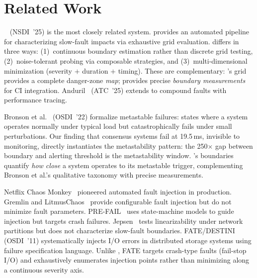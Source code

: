 \section{Related Work}
\label{sec:related}

\xinda{}~\cite{xinda} (NSDI~'25) is the most closely related system.
\xinda{} provides an automated pipeline for characterizing slow-fault
impacts via exhaustive grid evaluation. \system{} differs in three ways:
(1)~continuous boundary estimation rather than discrete grid testing,
(2)~noise-tolerant probing via composable strategies, and (3)~multi-dimensional
minimization (severity $+$ duration $+$ timing). These are complementary:
\xinda{}'s grid provides a complete danger-zone \emph{map}; \system{}
provides precise \emph{boundary measurements} for CI integration.
Anduril~\cite{anduril} (ATC~'25) extends \xinda{} to compound faults
with performance tracing.

Bronson et al.~\cite{bronson-metastable} (OSDI~'22) formalize metastable
failures: states where a system operates normally under typical load but
catastrophically fails under small perturbations. Our finding that consensus
systems fail at 19.5\,ms, invisible to monitoring, directly instantiates
the metastability pattern: the 250$\times$ gap between boundary and alerting
threshold is the metastability window. \system{}'s boundaries quantify
\emph{how close} a system operates to its metastable trigger, complementing
Bronson et al.'s qualitative taxonomy with precise measurements.

Netflix Chaos Monkey~\cite{basiri-chaos} pioneered automated fault injection
in production. Gremlin and LitmusChaos~\cite{litmus-chaos} provide
configurable fault injection but do not minimize fault parameters.
PRE-FAIL~\cite{pre-fail} uses state-machine models to guide injection but
targets crash failures. Jepsen~\cite{jepsen} tests linearizability under
network partitions but does not characterize slow-fault boundaries.
FATE/DESTINI~\cite{gunawi-fate} (OSDI~'11) systematically injects I/O errors
in distributed storage systems using failure specification language. Unlike
\system{}, FATE targets crash-type faults (fail-stop I/O) and exhaustively
enumerates injection points rather than minimizing along a continuous severity
axis.

